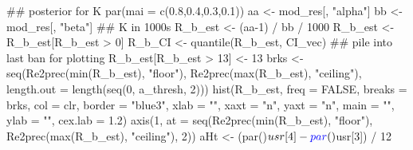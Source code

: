 \documentclass[11pt,]{article}
\newenvironment{Shaded}{}{}
\newcommand{\CommentTok}[1]{\textcolor[rgb]{0.00,0.50,0.00}{#1}}
\newcommand{\DataTypeTok}[1]{#1}
\newcommand{\DecValTok}[1]{#1}
\newcommand{\FloatTok}[1]{#1}
\newcommand{\KeywordTok}[1]{\textcolor[rgb]{0.00,0.00,1.00}{#1}}
\newcommand{\NormalTok}[1]{#1}
\newcommand{\OperatorTok}[1]{#1}
\newcommand{\OtherTok}[1]{\textcolor[rgb]{1.00,0.25,0.00}{#1}}
\newcommand{\StringTok}[1]{\textcolor[rgb]{0.00,0.50,0.50}{#1}}
\begin{document}
\begin{Shaded}
\begin{Highlighting}[]
\CommentTok{## posterior for K}
\KeywordTok{par}\NormalTok{(}\DataTypeTok{mai =} \KeywordTok{c}\NormalTok{(}\FloatTok{0.8}\NormalTok{,}\FloatTok{0.4}\NormalTok{,}\FloatTok{0.3}\NormalTok{,}\FloatTok{0.1}\NormalTok{))}
\NormalTok{aa <-}\StringTok{ }\NormalTok{mod_res[, }\StringTok{"alpha"}\NormalTok{]}
\NormalTok{bb <-}\StringTok{ }\NormalTok{mod_res[, }\StringTok{"beta"}\NormalTok{]}
\CommentTok{## K in 1000s}
\NormalTok{R_b_est <-}\StringTok{ }\NormalTok{(aa}\DecValTok{-1}\NormalTok{) }\OperatorTok{/}\StringTok{ }\NormalTok{bb }\OperatorTok{/}\StringTok{ }\DecValTok{1000}
\NormalTok{R_b_est <-}\StringTok{ }\NormalTok{R_b_est[R_b_est }\OperatorTok{>}\StringTok{ }\DecValTok{0}\NormalTok{]}
\NormalTok{R_b_CI <-}\StringTok{ }\KeywordTok{quantile}\NormalTok{(R_b_est, CI_vec)}
\CommentTok{## pile into last ban for plotting}
\NormalTok{R_b_est[R_b_est }\OperatorTok{>}\StringTok{ }\DecValTok{13}\NormalTok{] <-}\StringTok{ }\DecValTok{13}
\NormalTok{brks <-}\StringTok{ }\KeywordTok{seq}\NormalTok{(}\KeywordTok{Re2prec}\NormalTok{(}\KeywordTok{min}\NormalTok{(R_b_est), }\StringTok{"floor"}\NormalTok{),}
            \KeywordTok{Re2prec}\NormalTok{(}\KeywordTok{max}\NormalTok{(R_b_est), }\StringTok{"ceiling"}\NormalTok{),}
            \DataTypeTok{length.out =} \KeywordTok{length}\NormalTok{(}\KeywordTok{seq}\NormalTok{(}\DecValTok{0}\NormalTok{, a_thresh, }\DecValTok{2}\NormalTok{)))}
\KeywordTok{hist}\NormalTok{(R_b_est, }\DataTypeTok{freq =} \OtherTok{FALSE}\NormalTok{, }\DataTypeTok{breaks =}\NormalTok{ brks, }\DataTypeTok{col =}\NormalTok{ clr, }\DataTypeTok{border =} \StringTok{"blue3"}\NormalTok{,}
     \DataTypeTok{xlab =} \StringTok{""}\NormalTok{, }\DataTypeTok{xaxt =} \StringTok{"n"}\NormalTok{, }\DataTypeTok{yaxt =} \StringTok{"n"}\NormalTok{,}
     \DataTypeTok{main =} \StringTok{""}\NormalTok{, }\DataTypeTok{ylab =} \StringTok{""}\NormalTok{, }\DataTypeTok{cex.lab =} \FloatTok{1.2}\NormalTok{)}
\KeywordTok{axis}\NormalTok{(}\DecValTok{1}\NormalTok{, }\DataTypeTok{at =} \KeywordTok{seq}\NormalTok{(}\KeywordTok{Re2prec}\NormalTok{(}\KeywordTok{min}\NormalTok{(R_b_est), }\StringTok{"floor"}\NormalTok{),}
                 \KeywordTok{Re2prec}\NormalTok{(}\KeywordTok{max}\NormalTok{(R_b_est), }\StringTok{"ceiling"}\NormalTok{),}
                 \DecValTok{2}\NormalTok{))}
\NormalTok{aHt <-}\StringTok{ }\NormalTok{(}\KeywordTok{par}\NormalTok{()}\OperatorTok{$}\NormalTok{usr[}\DecValTok{4}\NormalTok{] }\OperatorTok{-}\StringTok{ }\KeywordTok{par}\NormalTok{()}\OperatorTok{$}\NormalTok{usr[}\DecValTok{3}\NormalTok{]) }\OperatorTok{/}\StringTok{ }\DecValTok{12}

\end{Highlighting}
\end{Shaded}
\end{document}
